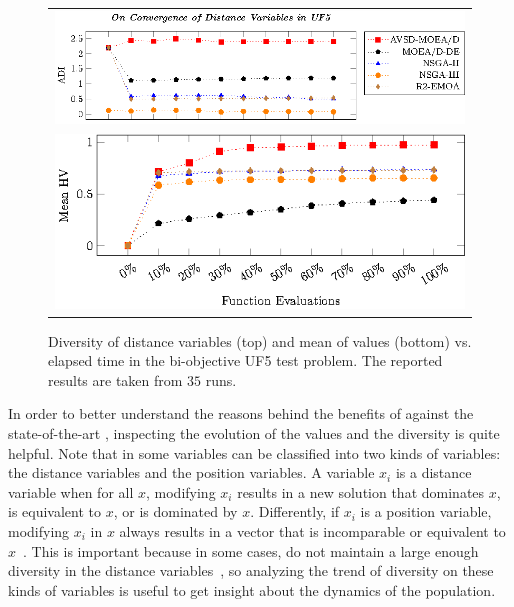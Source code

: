 \begin{figure}[t]
\centering
\begin{tabular}{l}
 \includegraphics[scale=0.75]{images/Diversity_Long_Term_tikz_UF5-figure0.eps}\\[0cm]%
 \includegraphics[scale=0.75]{images/Diversity_Long_Term_tikz_UF5-figure1.eps}\\[0cm]%
\end{tabular}
\caption{Diversity of distance variables (top) and mean of \HV{} values (bottom) vs. elapsed time in the bi-objective UF5 test problem. The reported results are taken from $35$ runs.}\label{fig:UF5_Diversity}
\end{figure}

In order to better understand the reasons behind the benefits of \AVSDMOEAD{} against the state-of-the-art \MOEAS{},
inspecting the evolution of the \HV{} values and the diversity is quite helpful.
%
Note that in some \MOPS{} variables can be classified into two kinds of variables: 
the distance variables and the position variables.
%
A variable $x_i$ is a distance variable when for all $x$, modifying $x_i$ results in a new solution 
that dominates $x$, is equivalent to $x$, or is dominated by $x$.
%
Differently, if $x_i$ is a position variable, modifying $x_i$ in $x$ always results in a vector that is 
incomparable or equivalent to $x$~\cite{huband2006review}.
%
This is important because in some cases, \MOEAS{} do not maintain a large enough diversity in the distance
variables~\cite{castillo2017multi}, so analyzing the trend of diversity on these kinds of variables is useful
to get insight about the dynamics of the population.

